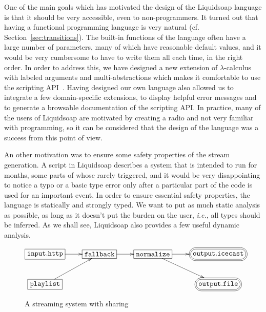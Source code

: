 \documentclass{llncs}
\newcommand{\liquidsoap}{Liquidsoap}
\newcommand{\ie}{\emph{i.e.},}
\newcommand{\cf}{{cf.~}}
\newcommand{\fcaption}[1]{\vspace{-3ex}\caption{#1}\vspace{-4ex}}
\begin{document}
One of the main goals which has motivated the design of the \liquidsoap{}
language is that it should be very accessible, even to non-programmers. It
turned out that having a functional programming language is very natural (\cf
Section~\ref{sec:transitions}). The built-in functions of the language often
have a large number of parameters, many of which have reasonable default 
values, and  it would be very cumbersome to have to write them all each time,
in the right order.
In order to address this, we have designed a new extension of
$\lambda$-calculus with labeled arguments and multi-abstractions which makes it
comfortable to use the scripting
API~\cite{baelde-mimram:webradio-lambda}. Having designed our own language also
allowed us to integrate a few domain-specific extensions, to display helpful
error messages and to generate a browsable documentation of the scripting API. In
practice, many of the users of \liquidsoap{} are motivated by creating a radio
and not very familiar with programming, so it can be considered that the design of
the language was a success from this point of view.

An other motivation was to ensure some safety properties of the stream
generation. A script in \liquidsoap{} describes a system that is intended to run
for months, some parts of whose rarely triggered, and it would be very
disappointing to notice a typo or a basic type error only after a particular
part of the code is used for an important event. In order to ensure essential
safety properties, the language is statically and strongly typed.
We want to put as
much static analysis as possible, as long as it doesn't put the burden on the
user, \ie{} all types should be inferred. As we shall see, \liquidsoap{} also
provides a few useful dynamic analysis.


\begin{figure}[t]
 \begin{center}
\[
\xymatrix{
  *+[F]{\mathtt{input.http}}\ar[r]&*+[F]{\mathtt{fallback}}\ar[r]&
  *+[F]{\mathtt{normalize}}\ar[r]\ar[dr]&
  *+<10pt>[F=:<30pt>]{\mathtt{output.icecast}}\\
  *+[F]{\mathtt{playlist}}\ar[ur]& & & *+<10pt>[F=:<30pt>]{\mathtt{output.file}}\\
}
\]
\end{center}
\fcaption{A streaming system with sharing}
\label{fig:sharing}
\end{figure}
\end{document}

